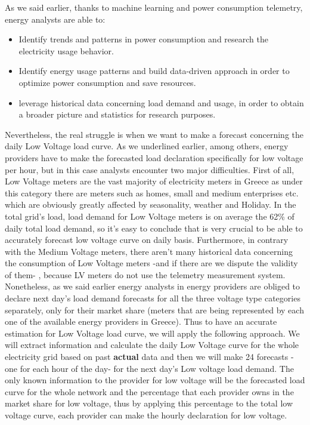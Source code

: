 \par As we said earlier, thanks to machine learning and power consumption telemetry, energy analysts are able to:
\begin{itemize}
    \item Identify trends and patterns in power consumption and research the  electricity usage behavior.
    \item Identify energy usage patterns and build data-driven approach in order to optimize power consumption and save resources.
    \item leverage historical data concerning load demand and usage, in order to obtain a broader picture and statistics for research purposes.
\end{itemize}
Nevertheless, the real struggle is when we want to make a forecast concerning the daily Low Voltage load curve. As we underlined earlier, among others, energy providers have to make the forecasted load declaration specifically for low voltage per hour, but in this case analysts encounter two major difficulties. First of all, Low Voltage meters are the vast majority of electricity meters in Greece as under this category there are meters such as homes, small and medium enterprises etc. which are obviously greatly affected by seasonality, weather and Holiday. In the total grid's load, load demand for Low Voltage meters is on average the 62\% of daily total load demand, so it's easy to conclude that is very crucial to be able to accurately forecast low voltage curve on daily basis. Furthermore, in contrary with the Medium Voltage meters, there aren't many historical data concerning the consumption of Low Voltage meters -and if there are we dispute the validity of them- , because LV meters do not use the telemetry measurement system.
Nonetheless, as we said earlier energy analysts in energy providers are obliged to declare next day's load demand forecasts for all the three voltage type categories separately, only for their market share (meters that are being represented by each one of the available energy providers in Greece). Thus to have an accurate estimation for Low Voltage load curve, we will apply the following approach. We will extract information and calculate the daily Low Voltage curve for the whole electricity grid based on past \textbf{actual} data and then we will make 24 forecasts - one for each hour of the day- for the next day's Low voltage load demand.
The only known information to the provider for low voltage will be the forecasted load curve for the whole network and the percentage that each provider owns in the market share for low voltage, thus by applying this percentage to the total low voltage curve, each provider can make the hourly declaration for low voltage. \newpage
